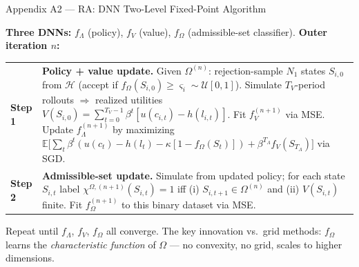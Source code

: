 \documentclass[10pt,aspectratio=169]{beamer}
\newcommand{\compacttables}{\renewcommand{\arraystretch}{1.15}}
\begin{document}
\begin{frame}[label=appRAalgo]{Appendix A2 --- RA: DNN Two-Level Fixed-Point Algorithm}
\hfill\hyperlink{mainRAalgo}{}
\vspace{0.2em}

\textbf{Three DNNs:} $f_\Lambda$ (policy), $f_V$ (value), $f_\Omega$ (admissible-set classifier).
\textbf{Outer iteration $n$:}

\smallskip
\compacttables\footnotesize
\begin{tabular}{p{0.9cm}p{10.9cm}}
\toprule
\textbf{Step 1} & \textbf{Policy + value update.} Given $\Omega^{(n)}$: rejection-sample $N_1$ states $S_{i,0}$ from
$\mathcal{H}$ (accept if $f_\Omega(S_{i,0})\ge\varsigma_i\sim\mathcal{U}[0,1]$). Simulate $T_V$-period rollouts
$\Rightarrow$ realized utilities $\hat V(S_{i,0})=\sum_{t=0}^{T_V-1}\beta^t[u(c_{i,t})-h(l_{i,t})]$.
Fit $f_V^{(n+1)}$ via MSE. Update $f_\Lambda^{(n+1)}$ by maximizing
$\mathbb{E}\big[\sum_t\beta^t(u(c_t)-h(l_t)-\kappa[1-f_\Omega(S_t)])+\beta^{T_\Lambda}f_V(S_{T_\Lambda})\big]$
via SGD. \\[0.3em]
\textbf{Step 2} & \textbf{Admissible-set update.} Simulate from updated policy; for each state $S_{i,t}$
label $\chi^{\Omega,(n+1)}(S_{i,t})=1$ iff (i) $S_{i,t+1}\in\Omega^{(n)}$ and (ii) $V(S_{i,t})$ finite.
Fit $f_\Omega^{(n+1)}$ to this binary dataset via MSE. \\
\bottomrule
\end{tabular}

\smallskip
Repeat until $f_\Lambda$, $f_V$, $f_\Omega$ all converge. The key innovation vs.\ grid methods:
$f_\Omega$ learns the \emph{characteristic function} of $\Omega$ --- no convexity, no grid, scales to higher dimensions.
\end{frame}
\end{document}
